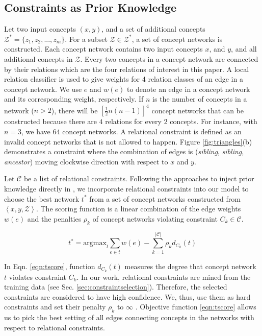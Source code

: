\subsection{Constraints as Prior Knowledge}
\label{sec:cons-prior-know}
Let two input concepts $(x,y)$, and a set of additional concepts
$\mathcal{Z}^*=\{z_1, z_2, ..., z_m\}$.  For a subset $\mathcal{Z} \in
\mathcal{Z}^*$, a set of concept networks is constructed. Each concept
network contains two input concepts $x$, and $y$, and all additional
concepts in $\mathcal{Z}$. Every two concepts in a concept network are
connected by their relations which are the four relations of interest
in this paper. A local relation classifier is used to give weights for
4 relation classes of an edge in a concept network. We use $e$ and
$w(e)$ to denote an edge in a concept network and its corresponding
weight, respectively. If $n$ is the number of concepts in a network
($n > 2$), there will be $\left [ \frac{1}{2} n(n-1) \right ] ^4$
concept networks that can be constructed because there are $4$
relations for every $2$ concepts. For instance, with $n=3$, we have
$64$ concept networks.  A relational constraint is defined as an
invalid concept networks that is not allowed to happen. Figure
\ref{fig:triangles}(b) demonstrates a constraint where the combination
of edges is ({\em sibling}, {\em sibling}, {\em ancestor}) moving
clockwise direction with respect to $x$ and $y$.

Let $\mathcal{C}$ be a list of relational constraints. Following the
approaches to inject prior knowledge directly in \cite{ChangRaRo08}, we
incorporate relational constraints into our model to choose the best
network $t^*$ from a set of concept networks constructed from $\left <
  x, y, \mathcal{Z} \right >$. The scoring function is a linear
combination of the edge weights $w(e)$ and the penalties $\rho_k$ of
concept networks violating constraint $C_k \in \mathcal{C}$.

\begin{equation}
  \label{eqn:tscore}
  t^* = \text{argmax}_{t} \sum_{e \in t} w(e) - \sum_{k=1}^{|\mathcal{C}|} \rho_{k} d_{C_k}(t)
\end{equation}

In Eqn. \ref{eqn:tscore}, function $d_{C_k}(t)$ measures the degree
that concept network $t$ violates constraint $C_k$.  In our work,
relational constraints are mined from the training data (see
Sec. \ref{sec:constraintselection}). Therefore, the selected
constraints are considered to have high confidence. We, thus, use them
as hard constraints and set their penalty $\rho_k$ to $\infty$
\cite{ChangRaRo08}. Objective function \ref{eqn:tscore} allows us to
pick the best setting of all edges connecting concepts in the networks
with respect to relational constraints.


